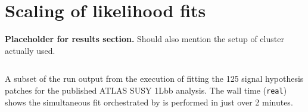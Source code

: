 \section{Scaling of likelihood fits}\label{sec:results}

\textbf{Placeholder for results section.}
Should also mention the setup of cluster actually used.

\begin{listing}
 \inputminted{text}{src/code/funcX_demo_output.txt}
 \caption{A subset of the run output from the execution of fitting the 125 signal hypothesis patches for the published ATLAS SUSY 1Lbb analysis.
 The wall time (\texttt{real}) shows the simultaneous fit orchestrated by \funcX{} is performed in just over 2 minutes.}
 \label{lst:funcX_demo_output}
\end{listing}
